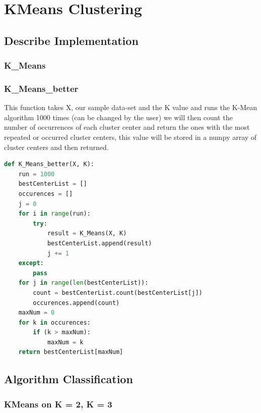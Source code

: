 \documentclass{article}
\begin{document}
	\section{KMeans Clustering}
	\subsection{Describe Implementation}
	
	\subsubsection{K\_Means}
	\subsubsection{K\_Means\_better}
	This function takes X, our sample data-set and the K value and runs the K-Mean algorithm 1000 times (can be changed by the user) we will then count the number of occurrences of each cluster center and return the ones with the most repeated or occurred cluster centers, this value will be stored in a numpy array of cluster centers and then returned.
	\begin{lstlisting}[language=Python]
	def K_Means_better(X, K):
	run = 1000
	bestCenterList = []
	occurences = []
	j = 0
	for i in range(run):
		try:
			result = K_Means(X, K)
			bestCenterList.append(result)
			j += 1
	except:
		pass
	for j in range(len(bestCenterList)):
		count = bestCenterList.count(bestCenterList[j])
		occurences.append(count)
	maxNum = 0
	for k in occurences:
		if (k > maxNum):
			maxNum = k
	return bestCenterList[maxNum]
	\end{lstlisting}
	\subsection{Algorithm Classification}
	\subsubsection{KMeans on K = 2, K = 3}
		
\end{document}
